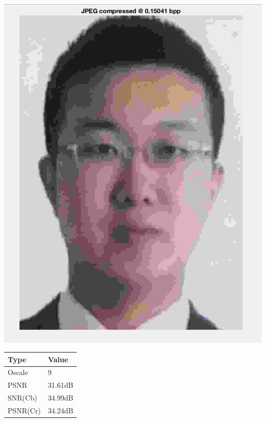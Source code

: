 \documentclass[titlepage]{article}
\begin{document}
\begin{center}
\includegraphics[width=.9\linewidth]{./img/p15_9.png}
\end{center}

\begin{center}
\begin{tabular}{ll}
Type & Value\\
\hline
Oscale & 9\\
PSNR & 31.61dB\\
SNR(Cb) & 34.99dB\\
PSNR(Cr) & 34.24dB\\
\end{tabular}
\end{center}
\end{document}
